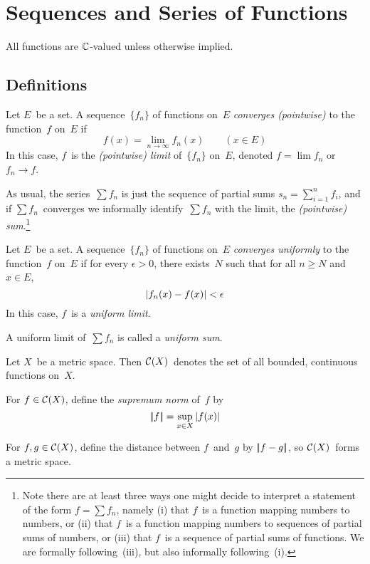 %
%
%
\section{Sequences and Series of Functions}
All functions are \(\mathbb{C}\)-valued unless otherwise implied.
\subsection*{Definitions}
\begin{defn}
Let \(E\)~be a set. A sequence~\(\{f_n\}\) of functions on~\(E\) \emph{converges (pointwise)} to the function~\(f\) on~\(E\) if
\[f(x)=\lim_{n\to\infty}f_n(x)\qquad(x\in E)\]
In this case, \(f\)~is the \emph{(pointwise) limit} of~\(\{f_n\}\) on~\(E\), denoted \(f=\lim f_n\) or \(f_n\to f\).

As usual, the series~\(\sum f_n\) is just the sequence of partial sums \(s_n=\sum_{i=1}^n f_i\), and if \(\sum f_n\)~converges we informally identify~\(\sum f_n\) with the limit, the \emph{(pointwise) sum}.\footnote{Note there are at least three ways one might decide to interpret a statement of the form \(f=\sum f_n\), namely (i) that \(f\)~is a function mapping numbers to numbers, or (ii) that \(f\)~is a function mapping numbers to sequences of partial sums of numbers, or (iii) that \(f\)~is a sequence of partial sums of functions. We are formally following~(iii), but also informally following~(i).}
\end{defn}

\begin{defn}
Let \(E\)~be a set. A sequence~\(\{f_n\}\) of functions on~\(E\) \emph{converges uniformly} to the function~\(f\) on~\(E\) if for every \(\epsilon>0\), there exists~\(N\) such that for all \(n\ge N\) and \(x\in E\),
\[|{f_n(x)-f(x)}|<\epsilon\]
In this case, \(f\)~is a \emph{uniform limit}.

A uniform limit of~\(\sum f_n\) is called a \emph{uniform sum}.
\end{defn}

\begin{defn}
Let \(X\)~be a metric space. Then \(\mathcal{C}(X)\)~denotes the set of all bounded, continuous functions on~\(X\).

For \(f\in\mathcal{C}(X)\), define the \emph{supremum norm} of~\(f\) by
\[\left|\!\left|{f}\right|\!\right|=\sup_{x\in X}|{f(x)}|\]

For \(f,g\in\mathcal{C}(X)\), define the distance between \(f\)~and~\(g\) by \(\left|\!\left|{f-g}\right|\!\right|\), so \(\mathcal{C}(X)\)~forms a metric space.
\end{defn}

